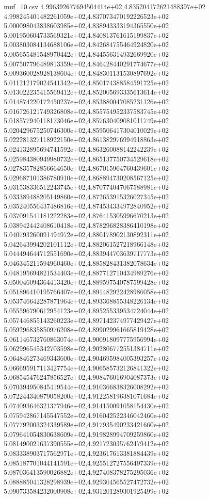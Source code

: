 \begin{filecontents*}{muf_10.csv}
4.996392677694504414e+02,4.835204172621488397e+02
4.998245401482261059e+02,4.837073470192226523e+02
5.000098043838603985e+02,4.838943333194365550e+02
5.001950604733569321e+02,4.840813761615199837e+02
5.003803084134688106e+02,4.842684755464924820e+02
5.005655481548970442e+02,4.844556314932669920e+02
5.007507796489813359e+02,4.846428440291774677e+02
5.009360028928138604e+02,4.848301131530897692e+02
5.011212179024541342e+02,4.850174388584591725e+02
5.013022235415569412e+02,4.852005693335613614e+02
5.014874220172450237e+02,4.853880047085231126e+02
5.016726121749326808e+02,4.855754952337583745e+02
5.018577940118173046e+02,4.857630409081011749e+02
5.020429675250746300e+02,4.859506417304010029e+02
5.022281327118922150e+02,4.861382976994918863e+02
5.024132895694741592e+02,4.863260088142242239e+02
5.025984380949980732e+02,4.865137750734529618e+02
5.027835782856664650e+02,4.867015964760439601e+02
5.029687101386780910e+02,4.868894730208567125e+02
5.031538336512243745e+02,4.870774047067588981e+02
5.033389488205149860e+02,4.872653915326027345e+02
5.035240556437486816e+02,4.874534334972840952e+02
5.037091541181222283e+02,4.876415305996670213e+02
5.038942442408610418e+02,4.878296828386410198e+02
5.040793260091494972e+02,4.880178902130892311e+02
5.042643994202101112e+02,4.882061527218966148e+02
5.044494644712551690e+02,4.883944703639717773e+02
5.046345211594960460e+02,4.885828431382078634e+02
5.048195694821534403e+02,4.887712710434989276e+02
5.050046094364413420e+02,4.889597540787599428e+02
5.051896410195766407e+02,4.891482922428986058e+02
5.053746642287871964e+02,4.893368855348226134e+02
5.055596790612954123e+02,4.895255339534724044e+02
5.057446855143260223e+02,4.897142374977429427e+02
5.059296835850976208e+02,4.899029961665819428e+02
5.061146732760863074e+02,4.900918097775956994e+02
5.062996545342703598e+02,4.902806772551384711e+02
5.064846273469343600e+02,4.904695984005393257e+02
5.066695917113427754e+02,4.906585732126841322e+02
5.068545476247856527e+02,4.908476016904087373e+02
5.070394950845419544e+02,4.910366838326008292e+02
5.072244340879058200e+02,4.912258196381071684e+02
5.074093646321377946e+02,4.914150091058154430e+02
5.075942867145547552e+02,4.916042522346042460e+02
5.077792003324339589e+02,4.917935490233421660e+02
5.079641054830638609e+02,4.919828994709259860e+02
5.081490021637390555e+02,4.921723035762479412e+02
5.083338903717562971e+02,4.923617613381884439e+02
5.085187701044141591e+02,4.925512727556497339e+02
5.087036413590026882e+02,4.927408378275295036e+02
5.088885041328298939e+02,4.929304565527472732e+02
5.090733584232000908e+02,4.931201289301925499e+02

\end{filecontents*}
